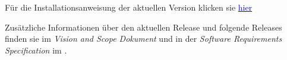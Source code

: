 \documentclass[paper=a4, parskip=half]{scrreprt}
\begin{document}
Für die Installationsanweisung der aktuellen Version klicken sie \href{https://github.com/HWR-Berlin-SWE-I-Gruppe-2-Team-3-2021/Genderly}{\textcolor{blue}{hier}}

Zusätzliche Informationen über den aktuellen Release und folgende Releases finden sie im \textit{Vision and Scope Dokument} und in der \textit{Software Requirements Specification} im \textcolor{blue}{}.


\printglossary
\pagebreak

\nocite{*}





\end{document}
